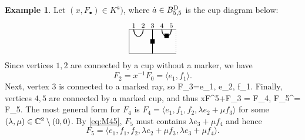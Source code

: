 \documentclass[11pt,reqno]{amsart}
\numberwithin{equation}{section}
\theoremstyle{definition}
\newtheorem{ex}[theorem]{Example}
\def\<{\langle}
\def\>{\rangle}
\newcommand{\BD}{{B}^\textup{D}}
\newcommand{\da}{\dot{a}}
\begin{document}
\endrmk
\begin{ex}\label{ex:UImU}
Let $(x, F_\bullet) \in K^{\da})$, where $\da \in \BD_{5,5}$ is the cup diagram below:
\[ 
\begin{tikzpicture}[baseline={(0,-.3)}, scale = 0.8]
\draw (3.75,0) -- (1.25,0)  -- (1.25,-1.3) --  (3.75,-1.3);
\draw[dotted] (3.75,-1.3) -- (3.75,0);
\begin{footnotesize}
\node at (1.5,.2) {$1$};
\node at (2.5, -.65) {$\blacksquare$};
\node at (2,.2) {$2$};
\node at (3.25, -.35) {$\blacksquare$};
\node at (2.5,.2) {$3$};
\node at (3,.2) {$4$};
\node at (3.5,.2) {$5$};
\end{footnotesize}
\draw[thick] (2.5,0) -- (2.5, -1.3);
\draw[thick] (1.5,0) .. controls +(0,-.5) and +(0,-.5) .. +(.5,0);
\draw[thick] (3,0) .. controls +(0,-.5) and +(0,-.5) .. +(.5,0);
\end{tikzpicture}
\]
Since vertices $1, 2$ are connected by a cup without a marker, we have 
\[
F_{2}=x^{-1}F_{0} = \<e_1, f_1\>.
\]
Next, vertex $3$ is connected to a marked ray, so 
\eq
F_3=\langle e_1, e_2, f_1\rangle.
\endeq
Finally, vertices $4, 5$ are connected by a marked cup, and thus
\eq\label{eq:M45}
xF^5+F_3 = F_4, \quad F_5^\perp = F_5.
\endeq
The most general form for $F_4$ is $F_4 = \<e_1,f_1,f_2, \lambda e_2+\mu f_3\>$ for some $(\lambda, \mu) \in \mathbb{C}^2\setminus (0,0)$. By \eqref{eq:M45}, $F_5$ must contains $\lambda e_3 + \mu f_4$ and hence
\[
F_5 =\<e_1,f_1,f_2, \lambda e_2+\mu f_3, \lambda e_3+\mu f_4\>.
\]
\end{ex}
\end{document}
